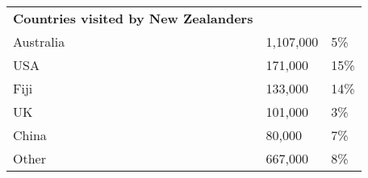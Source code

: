 \begin{tabular}[t]{p{4.7cm}>{\hfill}p{1.1cm}>{\hfill}p{1.7cm}}
 \textbf{Countries visited by New Zealanders} &   &   \\ 
 Australia & 1,107,000 & 5\% \\ 
  USA &   171,000 & 15\% \\ 
  Fiji &   133,000 & 14\% \\ 
  UK &   101,000 & 3\% \\ 
  China &    80,000 & 7\% \\ 
  Other &   667,000 & 8\% \\ 
  \end{tabular}
